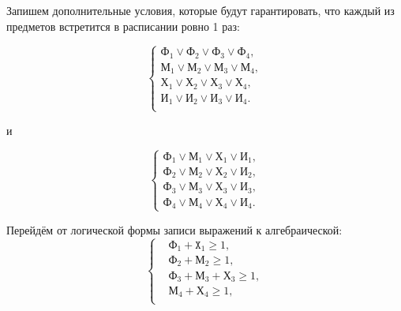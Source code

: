 Запишем дополнительные условия, которые будут гарантировать, что каждый
из предметов встретится в расписании ровно 1 раз:
\begin{minipage}[h!]{0.48\linewidth}
  \begin{equation*}
    \left\{
      \begin{aligned}
        \texttt{Ф}_1 \lor \texttt{Ф}_2 \lor \texttt{Ф}_3 \lor \texttt{Ф}_4, \\
        \texttt{М}_1 \lor \texttt{М}_2 \lor \texttt{М}_3 \lor \texttt{М}_4, \\
        \texttt{Х}_1 \lor \texttt{Х}_2 \lor \texttt{Х}_3 \lor \texttt{Х}_4, \\
        \texttt{И}_1 \lor \texttt{И}_2 \lor \texttt{И}_3 \lor \texttt{И}_4. \\
      \end{aligned}
    \right.
  \end{equation*}
\end{minipage}
\hfill
и
\hfill
\begin{minipage}[h!]{0.48\linewidth}
  \begin{equation*}
    \left\{
      \begin{aligned}
        \texttt{Ф}_1 \lor \texttt{М}_1 \lor \texttt{Х}_1 \lor \texttt{И}_1, \\
        \texttt{Ф}_2 \lor \texttt{М}_2 \lor \texttt{Х}_2 \lor \texttt{И}_2, \\
        \texttt{Ф}_3 \lor \texttt{М}_3 \lor \texttt{Х}_3 \lor \texttt{И}_3, \\
        \texttt{Ф}_4 \lor \texttt{М}_4 \lor \texttt{Х}_4 \lor \texttt{И}_4.
      \end{aligned}
    \right.
  \end{equation*}
\end{minipage}

\vspace{7mm}

\setlength{\belowdisplayskip}{0pt}

Перейдём от логической формы записи выражений к алгебраической:
\begin{equation*}
  \left\{
    \begin{aligned}
      &\texttt{Ф}_1 + \texttt{X}_1 \ge 1, \\
      &\texttt{Ф}_2 + \texttt{М}_2 \ge 1, \\
      &\texttt{Ф}_3 + \texttt{М}_3 + \texttt{Х}_3 \ge 1, \\
      &\texttt{М}_4 + \texttt{Х}_4 \ge 1, \\
    \end{aligned}
  \right.
\end{equation*}

